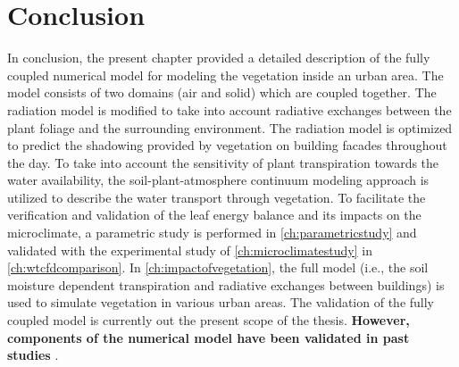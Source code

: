 \section{Conclusion}

In conclusion, the present chapter provided a detailed description of the fully coupled numerical model for modeling the vegetation inside an urban area. The model consists of two domains (air and solid) which are coupled together. The radiation model is modified to take into account radiative exchanges between the plant foliage and the surrounding environment. The radiation model is optimized to predict the shadowing provided by vegetation on building facades throughout the day. To take into account the sensitivity of plant transpiration towards the water availability, the soil-plant-atmosphere continuum modeling approach is utilized to describe the water transport through vegetation. To facilitate the verification and validation of the leaf energy balance and its impacts on the microclimate, a parametric study is performed in \cref{ch:parametricstudy} and validated with the experimental study of \cref{ch:microclimatestudy} in \cref{ch:wtcfdcomparison}. In \cref{ch:impactofvegetation}, the full model (i.e., the soil moisture dependent transpiration and radiative exchanges between buildings) is used to simulate vegetation in various urban areas. The validation of the fully coupled model is currently out the present scope of the thesis. \textbf{However, components of the numerical model have been validated in past studies} \citep{Kubilay2018}.

